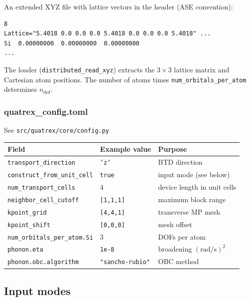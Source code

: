 An extended XYZ file with lattice vectors in the header (ASE
convention):
\begin{verbatim}
8
Lattice="5.4018 0.0 0.0 0.0 5.4018 0.0 0.0 0.0 5.4018" ...
Si  0.00000000  0.00000000  0.00000000
...
\end{verbatim}
The loader (\texttt{distributed\_read\_xyz}) extracts the $3\times3$
lattice matrix and Cartesian atom positions.  The number of atoms times
\texttt{num\_orbitals\_per\_atom} determines $n_\mathrm{dof}$.

\subsubsection{quatrex\_config.toml}
See \texttt{src/quatrex/core/config.py}
\begin{center}
\begin{tabular}{lll}
  \toprule
  Field & Example value & Purpose \\
  \midrule
  \texttt{transport\_direction}       & \texttt{'z'}              & BTD direction \\
  \texttt{construct\_from\_unit\_cell}& \texttt{true}             & input mode (see below) \\
  \texttt{num\_transport\_cells}      & 4                         & device length in unit cells \\
  \texttt{neighbor\_cell\_cutoff}     & \texttt{[1,1,1]}          & maximum block range \\
  \texttt{kpoint\_grid}               & \texttt{[4,4,1]}          & transverse MP mesh \\
  \texttt{kpoint\_shift}              & \texttt{[0,0,0]}          & mesh offset \\
  \texttt{num\_orbitals\_per\_atom.Si}& 3                         & DOFs per atom \\
  \texttt{phonon.eta}                 & \texttt{1e-8}             & broadening $(\mathrm{rad/s})^2$ \\
  \texttt{phonon.obc.algorithm}       & \texttt{"sancho-rubio"}   & OBC method \\
  \bottomrule
\end{tabular}
\end{center}

\subsection{Input modes}
\label{sec:input_modes}

